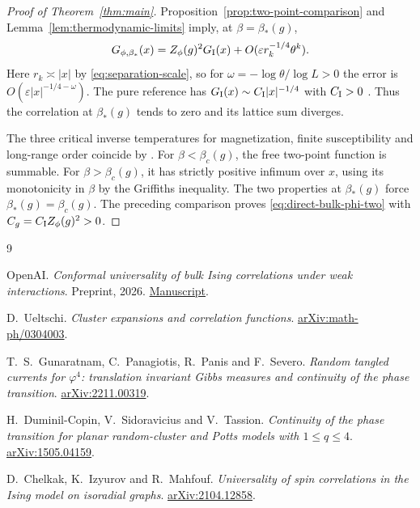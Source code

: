 \documentclass[11pt]{article}
\theoremstyle{definition}
\begin{document}
\begin{proof}[Proof of Theorem~\ref{thm:main}]
Proposition~\ref{prop:two-point-comparison} and
Lemma~\ref{lem:thermodynamic-limits} imply, at \(\beta=\beta_*(g)\),
\[
 G_{\phi,\beta_*}(x)
 =Z_\phi(g)^2G_{\rm I}(x)+O(\varepsilon r_k^{-1/4}\theta^k).
\]
Here \(r_k\asymp |x|\) by \eqref{eq:separation-scale}, so for
\(\omega=-\log\theta/\log L>0\) the error is
\(O(\varepsilon |x|^{-1/4-\omega})\).
The pure reference has \(G_{\rm I}(x)\sim C_{\rm I}|x|^{-1/4}\)
with \(C_{\rm I}>0\) \cite{CIMBulkSpin}. Thus the correlation at
\(\beta_*(g)\) tends to zero and its lattice sum diverges.

The three critical inverse temperatures for magnetization, finite
susceptibility and long-range order coincide by
\cite[Proposition C.1]{GPPSCurrents}. For \(\beta<\beta_c(g)\),
the free two-point function is summable. For
\(\beta>\beta_c(g)\), it has strictly positive infimum over \(x\),
using its monotonicity in \(\beta\) by the Griffiths inequality.
The two properties at \(\beta_*(g)\) force
\(\beta_*(g)=\beta_c(g)\). The preceding comparison proves
\eqref{eq:direct-bulk-phi-two} with
\(C_g=C_{\rm I}Z_\phi(g)^2>0\).
\end{proof}

\begingroup
\small
\begin{thebibliography}{9}
\setlength{\itemsep}{2pt}

OpenAI.
\emph{Conformal universality of bulk Ising correlations under weak interactions}.
Preprint, 2026.
\href{https://github.com/openai/math/blob/main/preprints/Conformal-universality-of-bulk-Ising-correlations-under-weak-interactions-September-23-2026/paper.pdf}{Manuscript}.

D.~Ueltschi.
\emph{Cluster expansions and correlation functions}.
\href{https://arxiv.org/abs/math-ph/0304003}{arXiv:math-ph/0304003}.

T.~S.~Gunaratnam, C.~Panagiotis, R.~Panis and F.~Severo.
\emph{Random tangled currents for \(\varphi^4\): translation invariant Gibbs measures and continuity of the phase transition}.
\href{https://arxiv.org/abs/2211.00319}{arXiv:2211.00319}.

H.~Duminil-Copin, V.~Sidoravicius and V.~Tassion.
\emph{Continuity of the phase transition for planar random-cluster and Potts models with \(1\le q\le4\)}.
\href{https://arxiv.org/abs/1505.04159}{arXiv:1505.04159}.

D.~Chelkak, K.~Izyurov and R.~Mahfouf.
\emph{Universality of spin correlations in the Ising model on isoradial graphs}.
\href{https://arxiv.org/abs/2104.12858}{arXiv:2104.12858}.

\end{thebibliography}
\endgroup
\end{document}
